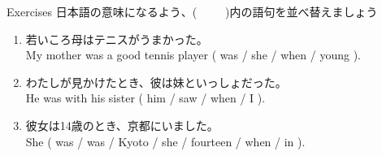 \documentclass[aspectratio=169,xcolor={dvipsnames,table}]{beamer}
\begin{document}
\begin{frame}[plain]{Exercises}
日本語の意味になるよう、(~~~~~)内の語句を並べ替えましょう%
\mbox{}\hfill{\scriptsize {}}

\begin{enumerate}
 \item 若いころ母はテニスがうまかった。\\
       My mother was a good tennis player ( was / she / when / young ).\\
 \item わたしが見かけたとき、彼は妹といっしょだった。\\
       He was with his sister ( him / saw / when / I ). \\
 \item  彼女は14歳のとき、京都にいました。\\
	She ( was / was / Kyoto / she / fourteen / when / in ).\\
\end{enumerate}
\end{frame}
\end{document}

